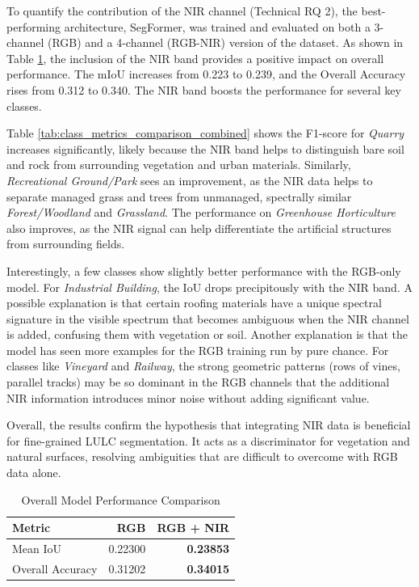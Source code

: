 \documentclass{report}
\begin{document}
To quantify the contribution of the NIR channel (Technical RQ 2), the best-performing architecture, SegFormer, was trained and evaluated on both a 3-channel (RGB) and a 4-channel (RGB-NIR) version of the dataset.
As shown in Table \ref{tab:model_performance_comparison}, the inclusion of the NIR band provides a positive impact on overall performance. The mIoU increases from 0.223 to 0.239, and the Overall Accuracy rises from 0.312 to 0.340.
The NIR band boosts the performance for several key classes. \par
Table \ref{tab:class_metrics_comparison_combined} shows the F1-score for \textit{Quarry} increases significantly, likely because the NIR band helps to distinguish bare soil and rock from surrounding vegetation and urban materials. Similarly, \textit{Recreational Ground/Park} sees an improvement, as the NIR data helps to separate managed grass and trees from unmanaged, spectrally similar \textit{Forest/Woodland} and \textit{Grassland}. The performance on \textit{Greenhouse Horticulture} also improves, as the NIR signal can help differentiate the artificial structures from surrounding fields. \par
Interestingly, a few classes show slightly better performance with the RGB-only model. For \textit{Industrial Building}, the IoU drops precipitously with the NIR band. A possible explanation is that certain roofing materials have a unique spectral signature in the visible spectrum that becomes ambiguous when the NIR channel is added, confusing them with vegetation or soil. Another explanation is that the model has seen more examples for the RGB training run by pure chance. For classes like \textit{Vineyard} and \textit{Railway}, the strong geometric patterns (rows of vines, parallel tracks) may be so dominant in the RGB channels that the additional NIR information introduces minor noise without adding significant value. \par
Overall, the results confirm the hypothesis that integrating NIR data is beneficial for fine-grained LULC segmentation. It acts as a discriminator for vegetation and natural surfaces, resolving ambiguities that are difficult to overcome with RGB data alone.

\begin{table}[H]
\centering
\caption{Overall Model Performance Comparison}
\label{tab:model_performance_comparison}
\begin{tabular}{lrr}
\toprule
Metric & RGB & RGB + NIR \\
\midrule
Mean IoU & 0.22300 & \textbf{0.23853}  \\
Overall Accuracy & 0.31202 & \textbf{0.34015}  \\
\bottomrule
\end{tabular}
\end{table}
\end{document}

